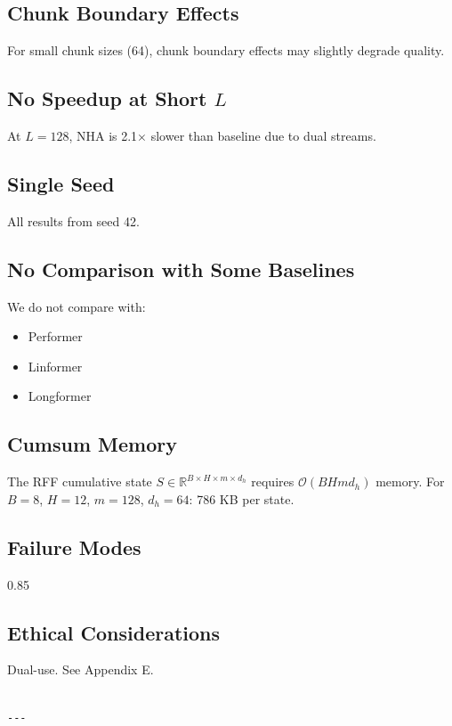 \subsection{Chunk Boundary Effects}

For small chunk sizes (64), chunk boundary effects may slightly degrade 
quality.

\subsection{No Speedup at Short $L$}

At $L = 128$, NHA is 2.1$\times$ slower than baseline due to dual 
streams.

\subsection{Single Seed}

All results from seed 42.

\subsection{No Comparison with Some Baselines}

We do not compare with:
\begin{itemize}
\item Performer
\item Linformer
\item Longformer

\end{itemize}
\subsection{Cumsum Memory}

The RFF cumulative state $S \in \mathbb{R}^{B \times H \times m \times d_h}$ 
requires $\mathcal{O}(B H m d_h)$ memory. For $B=8$, $H=12$, $m=128$, 
$d_h=64$: 786 KB per state.

\subsection{Failure Modes}

0.85

\subsection{Ethical Considerations}

Dual-use. See Appendix E.
\begin{lstlisting}

---
\end{lstlisting}


